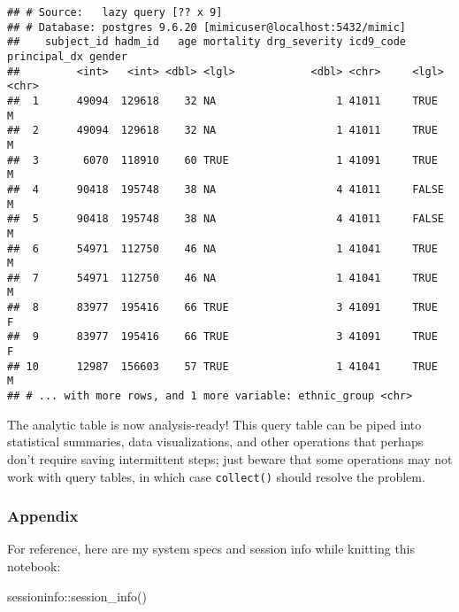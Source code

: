 \documentclass[
]{article}
\newenvironment{Shaded}{\begin{snugshade}}{\end{snugshade}}
\newcommand{\FunctionTok}[1]{\textcolor[rgb]{0.00,0.00,0.00}{#1}}
\newcommand{\NormalTok}[1]{#1}
\newcommand{\SpecialCharTok}[1]{\textcolor[rgb]{0.00,0.00,0.00}{#1}}
\begin{document}
\begin{verbatim}
## # Source:   lazy query [?? x 9]
## # Database: postgres 9.6.20 [mimicuser@localhost:5432/mimic]
##    subject_id hadm_id   age mortality drg_severity icd9_code principal_dx gender
##         <int>   <int> <dbl> <lgl>            <dbl> <chr>     <lgl>        <chr> 
##  1      49094  129618    32 NA                   1 41011     TRUE         M     
##  2      49094  129618    32 NA                   1 41011     TRUE         M     
##  3       6070  118910    60 TRUE                 1 41091     TRUE         M     
##  4      90418  195748    38 NA                   4 41011     FALSE        M     
##  5      90418  195748    38 NA                   4 41011     FALSE        M     
##  6      54971  112750    46 NA                   1 41041     TRUE         M     
##  7      54971  112750    46 NA                   1 41041     TRUE         M     
##  8      83977  195416    66 TRUE                 3 41091     TRUE         F     
##  9      83977  195416    66 TRUE                 3 41091     TRUE         F     
## 10      12987  156603    57 TRUE                 1 41041     TRUE         M     
## # ... with more rows, and 1 more variable: ethnic_group <chr>
\end{verbatim}

The analytic table is now analysis-ready! This query table can be piped
into statistical summaries, data visualizations, and other operations
that perhaps don't require saving intermittent steps; just beware that
some operations may not work with query tables, in which case
\texttt{collect()} should resolve the problem.

\hypertarget{appendix}{%
\subsubsection{Appendix}\label{appendix}}

For reference, here are my system specs and session info while knitting
this notebook:

\begin{Shaded}
\begin{Highlighting}[]
\NormalTok{sessioninfo}\SpecialCharTok{::}\FunctionTok{session\_info}\NormalTok{()}
\end{Highlighting}
\end{Shaded}
\end{document}
